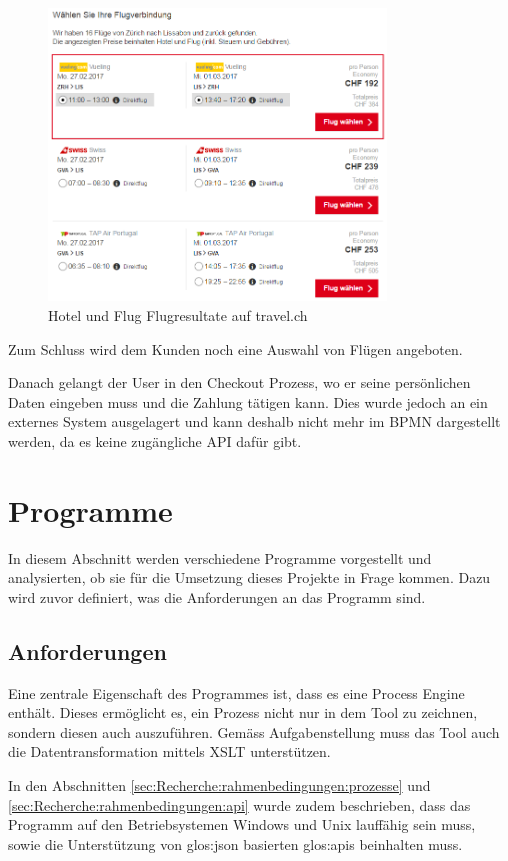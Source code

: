 \begin{figure}[H]
	\centering
	\includegraphics[width=0.8\textwidth]{images/travel-flights.png}
	\caption{Hotel und Flug Flugresultate auf travel.ch}
	\label{fig:recherche:travelch:flights}
\end{figure}
Zum Schluss wird dem Kunden noch eine Auswahl von Flügen angeboten.

Danach gelangt der User in den Checkout Prozess, wo er seine persönlichen Daten eingeben muss und die Zahlung tätigen kann. Dies wurde jedoch an ein externes System ausgelagert und kann deshalb nicht mehr im BPMN dargestellt werden, da es keine zugängliche API dafür gibt. 

\section{Programme}
In diesem Abschnitt werden verschiedene Programme vorgestellt und analysierten, ob sie für die Umsetzung dieses Projekte in Frage kommen. Dazu wird zuvor definiert, was die Anforderungen an das Programm sind.

\subsection{Anforderungen}
\label{sec:Recherche:programme:anforderungen}
Eine zentrale Eigenschaft des Programmes ist, dass es eine Process Engine enthält. Dieses ermöglicht es, ein Prozess nicht nur in dem Tool zu zeichnen, sondern diesen auch auszuführen. Gemäss Aufgabenstellung muss das Tool auch die Datentransformation mittels XSLT unterstützen.

In den Abschnitten \cref{sec:Recherche:rahmenbedingungen:prozesse}  und \cref{sec:Recherche:rahmenbedingungen:api}  wurde zudem beschrieben, dass das Programm auf den Betriebsystemen Windows und Unix lauffähig sein muss, sowie die Unterstützung von \Gls{glos:json} basierten \Glspl{glos:api} beinhalten muss.

